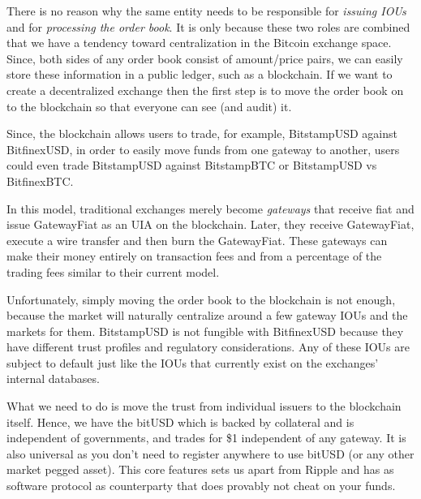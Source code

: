 There is no reason why the same entity needs to be responsible for
\emph{issuing IOUs} and for \emph{processing the order book}. It is only
because these two roles are combined that we have a tendency toward
centralization in the Bitcoin exchange space. Since, both sides of any order
book consist of amount/price pairs, we can easily store these information in a
public ledger, such as a blockchain. If we want to create a decentralized
exchange then the first step is to move the order book on to the blockchain so
that everyone can see (and audit) it. 

Since, the blockchain allows users to trade, for example, BitstampUSD against
BitfinexUSD, in order to easily move funds from one gateway to another, users
could even trade BitstampUSD against BitstampBTC or BitstampUSD vs BitfinexBTC.

In this model, traditional exchanges merely become \emph{gateways} that receive
fiat and issue GatewayFiat as an UIA on the blockchain. Later, they receive
GatewayFiat, execute a wire transfer and then burn the GatewayFiat. These
gateways can make their money entirely on transaction fees and from a
percentage of the trading fees similar to their current model.

Unfortunately, simply moving the order book to the blockchain is not enough,
because the market will naturally centralize around a few gateway IOUs and the
markets for them. BitstampUSD is not fungible with BitfinexUSD because they
have different trust profiles and regulatory considerations. Any of these IOUs
are subject to default just like the IOUs that currently exist on the
exchanges' internal databases. 

What we need to do is move the trust from individual issuers to the blockchain
itself. Hence, we have the bitUSD which is backed by collateral and is
independent of governments, and trades for \$1 independent of any gateway. It
is also universal as you don't need to register anywhere to use bitUSD (or any
other market pegged asset). This core features sets us apart from Ripple and
has as software protocol as counterparty that does provably not cheat on your
funds.
